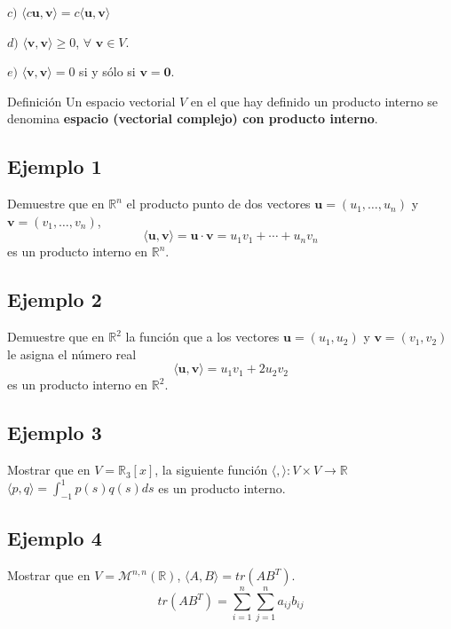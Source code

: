 \documentclass[
]{article}
\begin{document}
\(c)\)
\(\langle c\mathbf{u}, \mathbf{v}\rangle = c\langle \mathbf{u}, \mathbf{v}\rangle\)

\(d)\) \(\langle \mathbf{v}, \mathbf{v}\rangle \geq 0\),
\(\forall\,\, \mathbf{v}\in V\).

\(e)\) \(\langle \mathbf{v}, \mathbf{v}\rangle = 0\) si y sólo si
\(\mathbf{v}=\mathbf{0}\).

Definición Un espacio vectorial \(V\) en el que hay definido un producto
interno se denomina \textbf{espacio (vectorial complejo) con producto
interno}.

\hypertarget{ejemplo-1}{%
\subsection{Ejemplo 1}\label{ejemplo-1}}

Demuestre que en \(\mathbb{R}^n\) el producto punto de dos vectores
\(\mathbf{u}=(u_1,\ldots,u_n)\) y \(\mathbf{v}=(v_1,\ldots,v_n)\), \[
        \langle \mathbf{u}, \mathbf{v}\rangle = \mathbf{u}\cdot \mathbf{v} = u_1v_1 + \cdots + u_nv_n
\] es un producto interno en \(\mathbb{R}^n\).

\hypertarget{ejemplo-2}{%
\subsection{Ejemplo 2}\label{ejemplo-2}}

Demuestre que en \(\mathbb{R}^2\) la función que a los vectores
\(\mathbf{u}=(u_1,u_2)\) y \(\mathbf{v}=(v_1,v_2)\) le asigna el número
real \[
        \langle \mathbf{u}, \mathbf{v}\rangle = u_1v_1 + 2u_2v_2
\] es un producto interno en \(\mathbb{R}^2\).

\hypertarget{ejemplo-3}{%
\subsection{Ejemplo 3}\label{ejemplo-3}}

Mostrar que en \(V=\mathbb{R}_3[x]\), la siguiente función
\(\langle , \rangle:V\times V \rightarrow \mathbb{R}\)
\(\langle p, q\rangle=\int_{-1}^1p(s)q(s)ds\) es un producto interno.

\hypertarget{ejemplo-4}{%
\subsection{Ejemplo 4}\label{ejemplo-4}}

Mostrar que en \(V=\mathcal{M}^{n,n}(\mathbb{R})\),
\(\langle A,B \rangle = tr(AB^{T})\). \[
  tr(AB^{T}) = \sum_{i=1}^n\sum_{j=1}^na_{ij}b_{ij}
\]
\end{document}
